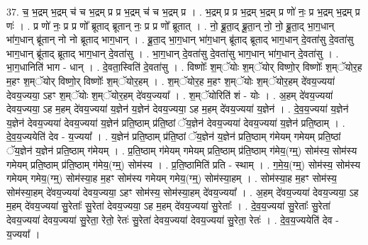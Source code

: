 \documentclass[17pt]{extarticle}
\begin{document}
37. च॒ भ॒द्रम् भ॒द्रम् च॑ च भ॒द्रम् प्र प्र भ॒द्रम् च॑ च भ॒द्रम् प्र । . भ॒द्रम् प्र प्र भ॒द्रम् भ॒द्रम् प्र णो॑ नः॒ प्र भ॒द्रम् भ॒द्रम् प्र णः॑ । . प्र णो॑ नः॒ प्र प्र णो᳚ ब्रूताद् ब्रूतान् नः॒ प्र प्र णो᳚ ब्रूतात् । . नो॒ ब्रू॒ता॒द् ब्रू॒ता॒न् नो॒ नो॒ ब्रू॒ता॒द् भा॒ग॒धान् भा॑ग॒धान् ब्रू॑तान् नो नो ब्रूताद् भाग॒धान् । . ब्रू॒ता॒द् भा॒ग॒धान् भा॑ग॒धान् ब्रू॑ताद् ब्रूताद् भाग॒धान् दे॒वता॑सु दे॒वता॑सु भाग॒धान् ब्रू॑ताद् ब्रूताद् भाग॒धान् दे॒वता॑सु । . भा॒ग॒धान् दे॒वता॑सु दे॒वता॑सु भाग॒धान् भा॑ग॒धान् दे॒वता॑सु । . भा॒ग॒धानिति॑ भाग - धान् । . दे॒वता॒स्विति॑ दे॒वता॑सु । . विष्णोः᳚ श॒म्ॅयोः श॒म्ॅयोर् विष्णो॒र् विष्णोः᳚ श॒म्ॅयोर॒ह म॒हꣳ श॒म्ॅयोर् विष्णो॒र् विष्णोः᳚ 
श॒म्ॅयोर॒हम् । . श॒म्ॅयोर॒ह म॒हꣳ श॒म्ॅयोः श॒म्ॅयोर॒हम् दे॑वय॒ज्यया॑ देवय॒ज्यया॒ ऽहꣳ श॒म्ॅयोः श॒म्ॅयोर॒हम् दे॑वय॒ज्यया᳚ । . श॒म्ॅयोरिति॑ शं - योः । . अ॒हम् दे॑वय॒ज्यया॑ देवय॒ज्यया॒ ऽह म॒हम् दे॑वय॒ज्यया॑ य॒ज्ञेन॑ य॒ज्ञेन॑ देवय॒ज्यया॒ ऽह म॒हम् दे॑वय॒ज्यया॑ य॒ज्ञेन॑ । . दे॒व॒य॒ज्यया॑ य॒ज्ञेन॑ य॒ज्ञेन॑ देवय॒ज्यया॑ देवय॒ज्यया॑ य॒ज्ञेन॑ प्रति॒ष्ठाम् प्र॑ति॒ष्ठां ॅय॒ज्ञेन॑ देवय॒ज्यया॑ देवय॒ज्यया॑ य॒ज्ञेन॑ प्रति॒ष्ठाम् । . दे॒व॒य॒ज्ययेति॑ देव - य॒ज्यया᳚ । . य॒ज्ञेन॑ प्रति॒ष्ठाम् प्र॑ति॒ष्ठां ॅय॒ज्ञेन॑ य॒ज्ञेन॑ प्रति॒ष्ठाम् ग॑मेयम् गमेयम् प्रति॒ष्ठां ॅय॒ज्ञेन॑ य॒ज्ञेन॑ प्रति॒ष्ठाम् ग॑मेयम् । . प्र॒ति॒ष्ठाम् ग॑मेयम् गमेयम् प्रति॒ष्ठाम् प्र॑ति॒ष्ठाम् ग॑मेय॒(ग्म्॒) सोम॑स्य॒ सोम॑स्य गमेयम् प्रति॒ष्ठाम् प्र॑ति॒ष्ठाम् ग॑मेय॒(ग्म्॒) सोम॑स्य । . प्र॒ति॒ष्ठामिति॑ प्रति - स्थाम् । . ग॒मे॒य॒(ग्म्॒) सोम॑स्य॒ सोम॑स्य गमेयम् गमेय॒(ग्म्॒) सोम॑स्या॒ह म॒हꣳ सोम॑स्य गमेयम् गमेय॒(ग्म्॒) सोम॑स्या॒हम् । . सोम॑स्या॒ह म॒हꣳ सोम॑स्य॒ सोम॑स्या॒हम् दे॑वय॒ज्यया॑ देवय॒ज्यया॒ ऽहꣳ सोम॑स्य॒ सोम॑स्या॒हम् दे॑वय॒ज्यया᳚ । . अ॒हम् दे॑वय॒ज्यया॑ देवय॒ज्यया॒ ऽह म॒हम् दे॑वय॒ज्यया॑ सु॒रेताः᳚ सु॒रेता॑ देवय॒ज्यया॒ ऽह म॒हम् दे॑वय॒ज्यया॑ सु॒रेताः᳚ । . दे॒व॒य॒ज्यया॑ सु॒रेताः᳚ सु॒रेता॑ देवय॒ज्यया॑ देवय॒ज्यया॑ सु॒रेता॒ रेतो॒ रेतः॑ सु॒रेता॑ देवय॒ज्यया॑ देवय॒ज्यया॑ सु॒रेता॒ रेतः॑ । . दे॒व॒य॒ज्ययेति॑ देव - य॒ज्यया᳚ । \newline
\pagebreak
{}
\end{document}
